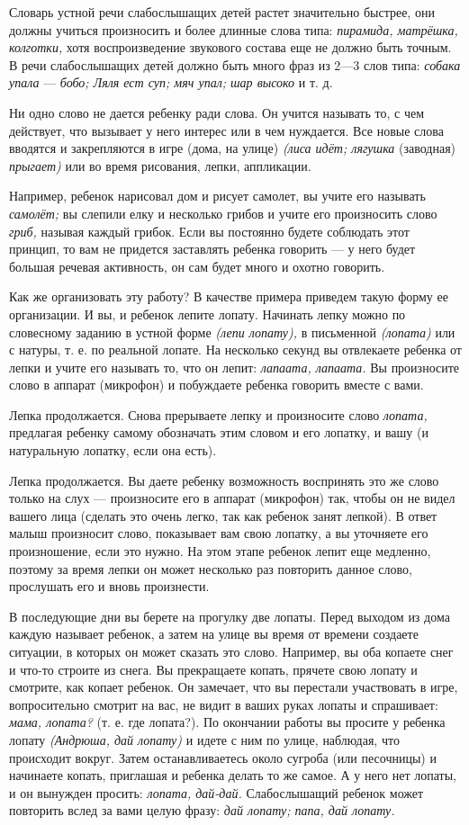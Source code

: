 \documentclass[a5paper]{book}
\renewcommand{\emph}[1]{\textit{#1}}
\begin{document}
Словарь устной речи слабослышащих детей растет значительно быстрее, они
должны учиться произносить и более длинные слова типа: \emph{пирамида,
матрёшка, колготки,} хотя воспроизведение звукового состава еще не
должно быть точным. В речи слабослышащих детей должно быть много фраз из
2---3 слов типа: \emph{собака упала} --- \emph{бобо; Ляля ест суп; мяч
упал; шар высоко} и т. д.

Ни одно слово не дается ребенку ради слова. Он учится называть то, с чем
действует, что вызывает у него интерес или в чем нуждается. Все новые
слова вводятся и закрепляются в игре (дома, на улице) \emph{(лиса идёт;
лягушка} (заводная) \emph{прыгает)} или во время рисования, лепки,
аппликации.

Например, ребенок нарисовал дом и рисует самолет, вы учите его называть
\emph{самолёт;} вы слепили елку и несколько грибов и учите его
произносить слово \emph{гриб,} называя каждый грибок. Если вы постоянно
будете соблюдать этот принцип, то вам не придется заставлять ребенка
говорить --- у него будет большая речевая активность, он сам будет много
и охотно говорить.

Как же организовать эту работу? В качестве примера приведем такую форму
ее организации. И вы, и ребенок лепите лопату. Начинать лепку можно по
словесному заданию в устной форме \emph{(лепи лопату),} в письменной
\emph{(лопата)} или с натуры, т. е. по реальной лопате. На несколько
секунд вы отвлекаете ребенка от лепки и учите его называть то, что он
лепит: \emph{лапаата, лапаата.} Вы произносите слово в аппарат
(микрофон) и побуждаете ребенка говорить вместе с вами.

Лепка продолжается. Снова прерываете лепку и произносите слово
\emph{лопата,} предлагая ребенку самому обозначать этим словом и его
лопатку, и вашу (и натуральную лопатку, если она есть).

Лепка продолжается. Вы даете ребенку возможность воспринять это же слово
только на слух --- произносите его в аппарат (микрофон) так, чтобы он не
видел вашего лица (сделать это очень легко, так как ребенок занят
лепкой). В ответ малыш произносит слово, показывает вам свою лопатку, а
вы уточняете его произношение, если это нужно. На этом этапе ребенок
лепит еще медленно, поэтому за время лепки он может несколько раз
повторить данное слово, прослушать его и вновь произнести.

В последующие дни вы берете на прогулку две лопаты. Перед выходом из
дома каждую называет ребенок, а затем на улице вы время от времени
создаете ситуации, в которых он может сказать это слово. Например, вы
оба копаете снег и что-то строите из снега. Вы прекращаете копать,
прячете свою лопату и смотрите, как копает ребенок. Он замечает, что вы
перестали участвовать в игре, вопросительно смотрит на вас, не видит в
ваших руках лопаты и спрашивает: \emph{мама, лопата?} (т. е. где
лопата?). По окончании работы вы просите у ребенка лопату
\emph{(Андрюша, дай лопату)} и идете с ним по улице, наблюдая, что
происходит вокруг. Затем останавливаетесь около сугроба (или песочницы)
и начинаете копать, приглашая и ребенка делать то же самое. А у него нет
лопаты, и он вынужден просить: \emph{лопата, дай-дай.} Слабослышащий
ребенок может повторить вслед за вами целую фразу: \emph{дай лопату;
папа, дай лопату.}
\end{document}
